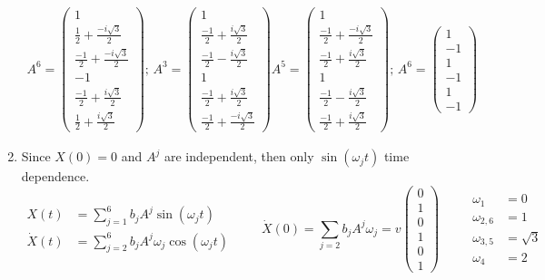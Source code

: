 \documentclass[twoside,10pt]{amsart}
\begin{document}
\begin{enumerate}
\[\begin{gathered}
A^6 = \left( \begin{matrix} 1 \\ \frac{1}{2} + \frac{ -i \sqrt{3}}{2}  \\  \frac{-1}{2} + \frac{ -i \sqrt{3}}{2}   \\ -1 \\  \frac{-1}{2} + \frac{ i \sqrt{3}}{2}  \\  \frac{1}{2} + \frac{ i \sqrt{3}}{2}  \end{matrix} \right) ; \, 
A^3 = \left( \begin{matrix} 1 \\ \frac{-1}{2} + \frac{ i \sqrt{3}}{2} \\  \frac{-1}{2} - \frac{ i \sqrt{3}}{2}   \\ 1 \\  \frac{-1}{2} + \frac{ i \sqrt{3}}{2}  \\  \frac{-1}{2} + \frac{ -i \sqrt{3}}{2}  \end{matrix} \right)
A^5 = \left( \begin{matrix} 1 \\ \frac{-1}{2} + \frac{ -i \sqrt{3}}{2}  \\  \frac{-1}{2} + \frac{ i \sqrt{3}}{2}   \\ 1 \\  \frac{-1}{2} - \frac{ i \sqrt{3}}{2}  \\  \frac{-1}{2} + \frac{ i \sqrt{3}}{2}  \end{matrix} \right); \,
A^6 = \left( \begin{matrix} 1 \\ -1 \\ 1 \\ -1 \\ 1 \\ -1 \end{matrix} \right)
\end{gathered}
\]
\item Since $X(0) =0$ and $A^j$ are independent, then only $\sin{(\omega_j t)}$ time dependence.  
\[
\begin{aligned}
  X(t) & = \sum_{j=1}^6 b_j A^j \sin{(\omega_j t)} \\
  \dot{X}(t) & = \sum_{j=2}^6 b_j A^j \omega_j \cos{(\omega_j t) }
\end{aligned} \quad \quad \, \dot{X}(0) = \sum_{j=2} b_j A^j \omega_j = v \left( \begin{matrix} 0 \\ 1 \\ 0 \\ 1 \\ 0 \\ 1 \end{matrix} \right) \quad \quad \, \begin{aligned} \omega_1 & = 0 \\ \omega_{2,6} & = 1 \\ \omega_{3,5} & = \sqrt{3} \\ \omega_4 &  = 2 \end{aligned}
\]


\end{enumerate}
\end{document}
